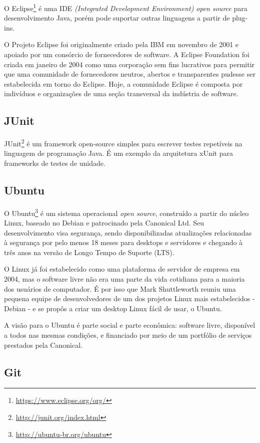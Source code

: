O Eclipse\footnote{\url{https://www.eclipse.org/org/}} é uma IDE \textit{(Integrated Development Environment)} \textit{open source} para desenvolvimento Java, porém pode suportar outras linguagens a partir de plug-ins. 

O Projeto Eclipse foi originalmente criado pela IBM em novembro de 2001 e apoiado por um consórcio de fornecedores de software. A Eclipse Foundation foi criada em janeiro de 2004 como uma corporação sem fins lucrativos para permitir que uma comunidade de fornecedores neutros, abertos e transparentes pudesse ser estabelecida em torno do Eclipse. Hoje, a comunidade Eclipse é composta por indivíduos e organizações de uma seção transversal da indústria de software.

\subsection{JUnit}

JUnit\footnote{\url{http://junit.org/index.html}} é um framework open-source simples para escrever testes repetíveis na linguagem de programação Java. É um exemplo da arquitetura xUnit para frameworks de testes de unidade.

\subsection{Ubuntu}

O Ubuntu\footnote{\url{http://ubuntu-br.org/ubuntu}} é um sistema operacional \textit{open source}, construído a partir do núcleo Linux, baseado no Debian e patrocinado pela Canonical Ltd. Seu desenvolvimento visa segurança, sendo disponibilizadas atualizações relacionadas à segurança por pelo menos 18 meses para desktops e servidores e chegando à três anos na versão de Longo Tempo de Suporte (LTS).

O Linux já foi estabelecido como uma plataforma de servidor de empresa em 2004, mas o software livre não era uma parte da vida cotidiana para a maioria dos usuários de computador. É por isso que Mark Shuttleworth reuniu uma pequena equipe de desenvolvedores de um dos projetos Linux mais estabelecidos - Debian - e se propôs a criar um desktop Linux fácil de usar, o Ubuntu.

A visão para o Ubuntu é parte social e parte econômica: software livre, disponível a todos nas mesmas condições, e financiado por meio de um portfólio de serviços prestados pela Canonical.

\subsection{Git}

